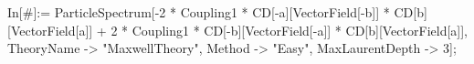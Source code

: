 In[#]:= ParticleSpectrum[-2 * Coupling1 * CD[-a][VectorField[-b]] * CD[b][VectorField[a]] + 2 * Coupling1 * CD[-b][VectorField[-a]] * CD[b][VectorField[a]], TheoryName -> "MaxwellTheory", Method -> "Easy", MaxLaurentDepth -> 3]; 